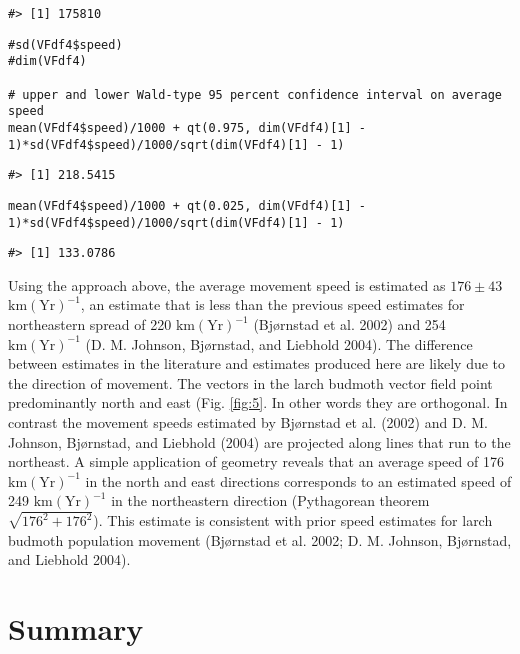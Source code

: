 \begin{verbatim}
#> [1] 175810
\end{verbatim}

\begin{verbatim}
#sd(VFdf4$speed)
#dim(VFdf4)

# upper and lower Wald-type 95 percent confidence interval on average speed
mean(VFdf4$speed)/1000 + qt(0.975, dim(VFdf4)[1] - 1)*sd(VFdf4$speed)/1000/sqrt(dim(VFdf4)[1] - 1)
\end{verbatim}

\begin{verbatim}
#> [1] 218.5415
\end{verbatim}

\begin{verbatim}
mean(VFdf4$speed)/1000 + qt(0.025, dim(VFdf4)[1] - 1)*sd(VFdf4$speed)/1000/sqrt(dim(VFdf4)[1] - 1)
\end{verbatim}

\begin{verbatim}
#> [1] 133.0786
\end{verbatim}

Using the approach above, the average movement speed is estimated as \(176 \pm 43\) \(\text{km}(\text{Yr})^{-1}\), an estimate that is less than the previous speed estimates for northeastern spread of 220 \(\text{km}(\text{Yr})^{-1}\) (Bjørnstad et al. 2002) and 254 \(\text{km}(\text{Yr})^{-1}\) (D. M. Johnson, Bjørnstad, and Liebhold 2004). The difference between estimates in the literature and estimates produced here are likely due to the direction of movement. The vectors in the larch budmoth vector field point predominantly north and east (Fig. \ref{fig:5}. In other words they are orthogonal. In contrast the movement speeds estimated by Bjørnstad et al. (2002) and D. M. Johnson, Bjørnstad, and Liebhold (2004) are projected along lines that run to the northeast. A simple application of geometry reveals that an average speed of 176 \(\text{km}(\text{Yr})^{-1}\) in the north and east directions corresponds to an estimated speed of 249 \(\text{km}(\text{Yr})^{-1}\) in the northeastern direction (Pythagorean theorem \(\sqrt{176^2 + 176^2}\)). This estimate is consistent with prior speed estimates for larch budmoth population movement (Bjørnstad et al. 2002; D. M. Johnson, Bjørnstad, and Liebhold 2004).

\hypertarget{summary}{%
\section{Summary}\label{summary}}

